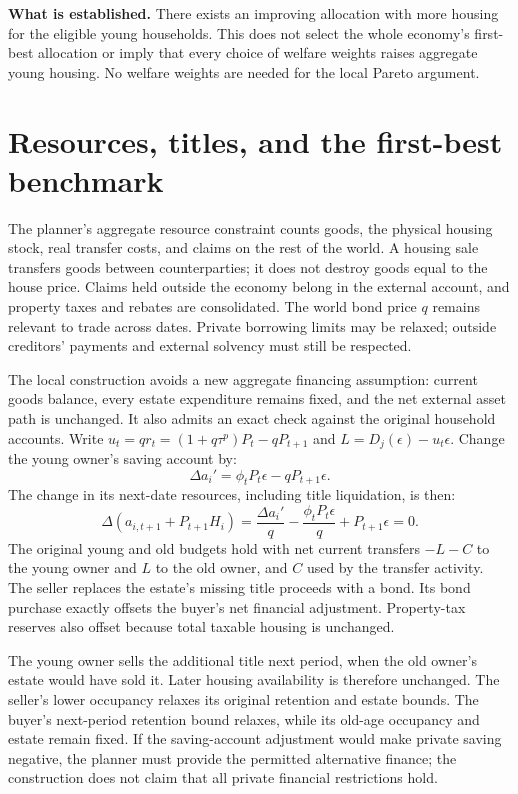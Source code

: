 \documentclass[11pt]{article}
\begin{document}
\textbf{What is established.} There exists an improving allocation with more
housing for the eligible young households. This does not select the whole
economy's first-best allocation or imply that every choice of welfare weights
raises aggregate young housing. No welfare weights are needed for the local
Pareto argument.

\section{Resources, titles, and the first-best benchmark}

The planner's aggregate resource constraint counts goods, the physical housing
stock, real transfer costs, and claims on the rest of the world. A housing sale
transfers goods between counterparties; it does not destroy goods equal to the
house price. Claims held outside the economy belong in the external account,
and property taxes and rebates are consolidated. The world bond price $q$
remains relevant to trade across dates. Private borrowing limits
may be relaxed; outside creditors' payments and external solvency must still
be respected.

The local construction avoids a new aggregate financing assumption: current
goods balance, every estate expenditure remains fixed, and the net external
asset path is unchanged. It also admits an exact check against the original
household accounts. Write $u_t=q r_t=(1+q\tau^p)P_t-qP_{t+1}$ and
$L=D_j(\epsilon)-u_t\epsilon$. Change the young owner's saving account by:
\begin{equation}
 \Delta a_i'=\phi_tP_t\epsilon-qP_{t+1}\epsilon.
\end{equation}
The change in its next-date resources, including title liquidation, is then:
\begin{equation}
 \Delta(a_{i,t+1}+P_{t+1}H_i)
 =\frac{\Delta a_i'}q-\frac{\phi_tP_t\epsilon}q+P_{t+1}\epsilon=0.
\end{equation}
The original young and old budgets hold with net current transfers $-L-C$ to
the young owner and $L$ to the old owner, and $C$ used by the transfer activity.
The seller replaces the estate's missing title proceeds with a bond. Its bond
purchase exactly offsets the buyer's net financial adjustment. Property-tax
reserves also offset because total taxable housing is unchanged.

The young owner sells the additional title next period, when the old owner's
estate would have sold it. Later housing availability is therefore unchanged.
The seller's lower occupancy relaxes its original retention and estate bounds.
The buyer's next-period retention bound relaxes, while its old-age occupancy
and estate remain fixed. If the saving-account adjustment would make private
saving negative, the planner must provide the permitted alternative finance;
the construction does not claim that all private financial restrictions hold.
\end{document}
